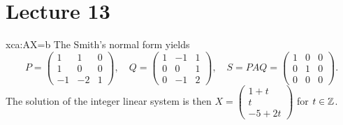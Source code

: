     

\section*{Lecture 13}

\begin{sol}{xca:AX=b}
	The Smith's normal form yields 
	\[
		P=\begin{pmatrix}
			1 & 1 & 0\\
			1 & 0 & 0\\
			-1 & -2 & 1
		\end{pmatrix},
		\quad
		Q=\begin{pmatrix}
			1 & -1 & 1\\
			0 & 0 & 1\\
			0 & -1 & 2
		\end{pmatrix},\quad
		S=PAQ=\begin{pmatrix}
			1 & 0 & 0\\
			0 & 1 & 0\\
			0 & 0 & 0
		\end{pmatrix}.
	\]
	The solution of the integer linear system is then
	$X=\begin{pmatrix}
		1 + t\\
		t\\
		-5+2t
	\end{pmatrix}$ for $t\in\mathbb{Z}$. 
\end{sol}

